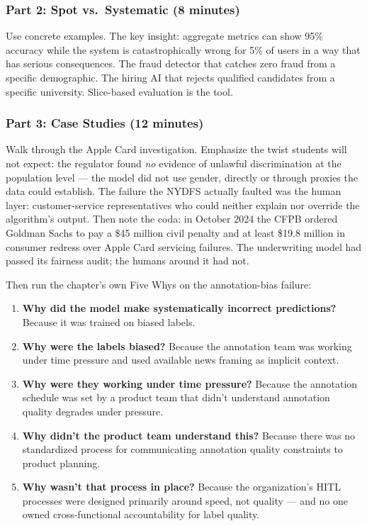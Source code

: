 \subsubsection{Part 2: Spot vs.\ Systematic (8 minutes)}

Use concrete examples. The key insight: aggregate metrics can show 95\% accuracy while the system is catastrophically wrong for 5\% of users in a way that has serious consequences. The fraud detector that catches zero fraud from a specific demographic. The hiring AI that rejects qualified candidates from a specific university. Slice-based evaluation is the tool.

\subsubsection{Part 3: Case Studies (12 minutes)}

Walk through the Apple Card investigation. Emphasize the twist students will not expect: the regulator found \emph{no} evidence of unlawful discrimination at the population level --- the model did not use gender, directly or through proxies the data could establish. The failure the NYDFS actually faulted was the human layer: customer-service representatives who could neither explain nor override the algorithm's output. Then note the coda: in October 2024 the CFPB ordered Goldman Sachs to pay a \$45 million civil penalty and at least \$19.8 million in consumer redress over Apple Card servicing failures. The underwriting model had passed its fairness audit; the humans around it had not.

Then run the chapter's own Five Whys on the annotation-bias failure:
\begin{enumerate}
    \item \textbf{Why did the model make systematically incorrect predictions?} Because it was trained on biased labels.
    \item \textbf{Why were the labels biased?} Because the annotation team was working under time pressure and used available news framing as implicit context.
    \item \textbf{Why were they working under time pressure?} Because the annotation schedule was set by a product team that didn't understand annotation quality degrades under pressure.
    \item \textbf{Why didn't the product team understand this?} Because there was no standardized process for communicating annotation quality constraints to product planning.
    \item \textbf{Why wasn't that process in place?} Because the organization's HITL processes were designed primarily around speed, not quality --- and no one owned cross-functional accountability for label quality.
\end{enumerate}

